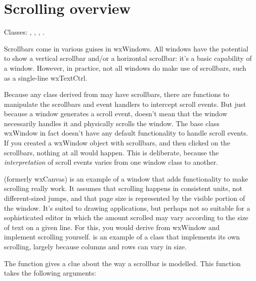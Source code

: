 \section{Scrolling overview}\label{scrollingoverview}

Classes: , , , .

Scrollbars come in various guises in wxWindows. All windows have the potential
to show a vertical scrollbar and/or a horizontal scrollbar: it's a basic capability of a window.
However, in practice, not all windows do make use of scrollbars, such as a single-line wxTextCtrl.

Because any class derived from   may have scrollbars,
there are functions to manipulate the scrollbars and event handlers to intercept
scroll events. But just because a window generates a scroll event, doesn't mean
that the window necessarily handles it and physically scrolls the window. The base class
wxWindow in fact doesn't have any default functionality to handle scroll events.
If you created a wxWindow object with scrollbars, and then clicked on the scrollbars, nothing
at all would happen. This is deliberate, because the {\it interpretation} of scroll
events varies from one window class to another.

 (formerly wxCanvas) is an example of a window that
adds functionality to make scrolling really work. It assumes that scrolling happens in
consistent units, not different-sized jumps, and that page size is represented
by the visible portion of the window. It's suited to drawing applications, but perhaps
not so suitable for a sophisticated editor in which the amount scrolled may vary according
to the size of text on a given line. For this, you would derive from wxWindow and
implement scrolling yourself.  is an example of a class
that implements its own scrolling, largely because columns and rows can vary in size.


The function  gives a clue about
the way a scrollbar is modelled. This function takes the following arguments:

\twocolwidtha{5cm}%
\begin{twocollist}
\end{twocollist}%

